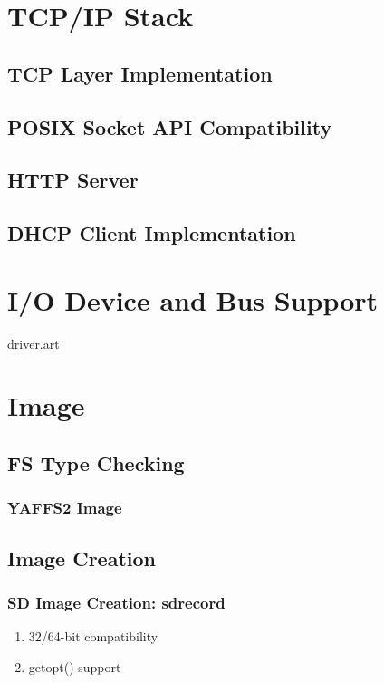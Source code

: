 \documentclass[a4paper,11pt]{book}
\begin{document}
\chapter{TCP/IP Stack}

\section{TCP Layer Implementation}

\section{POSIX Socket API Compatibility}

\section{HTTP Server}

\section{DHCP Client Implementation}

\chapter{I/O Device and Bus Support}
 {driver.art}

\chapter{Image}

\section{FS Type Checking}

\subsection{YAFFS2 Image}

\section{Image Creation}

\subsection{SD Image Creation: sdrecord}
\begin{enumerate}
\item 32/64-bit compatibility
\item getopt() support
\end{enumerate}
\end{document}
